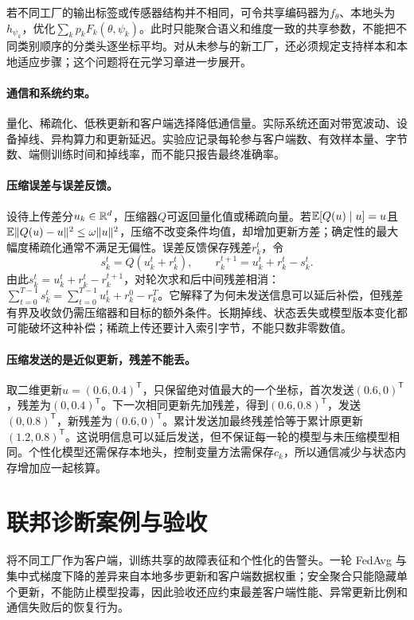 若不同工厂的输出标签或传感器结构并不相同，可令共享编码器为$f_\theta$、本地头为$h_{\psi_k}$，优化$\sum_kp_kF_k(\theta,\psi_k)$。此时只能聚合语义和维度一致的共享参数，不能把不同类别顺序的分类头逐坐标平均。对从未参与的新工厂，还必须规定支持样本和本地适应步骤；这个问题将在元学习章进一步展开。

\paragraph{通信和系统约束。}
量化、稀疏化、低秩更新和客户端选择降低通信量。实际系统还面对带宽波动、设备掉线、异构算力和更新延迟。实验应记录每轮参与客户端数、有效样本量、字节数、端侧训练时间和掉线率，而不能只报告最终准确率。

\paragraph{压缩误差与误差反馈。}
设待上传差分$u_k\in\mathbb{R}^d$，压缩器$Q$可返回量化值或稀疏向量。若$\mathbb{E}[Q(u)\mid u]=u$且$\mathbb{E}\|Q(u)-u\|^2\leq\omega\|u\|^2$，压缩不改变条件均值，却增加更新方差；确定性的最大幅度稀疏化通常不满足无偏性。误差反馈保存残差$r_k^t$，令
\begin{equation}
 s_k^t=Q(u_k^t+r_k^t),\qquad
 r_k^{t+1}=u_k^t+r_k^t-s_k^t.
\end{equation}
由此$s_k^t=u_k^t+r_k^t-r_k^{t+1}$，对轮次求和后中间残差相消：$\sum_{t=0}^{T-1}s_k^t=\sum_{t=0}^{T-1}u_k^t+r_k^0-r_k^T$。它解释了为何未发送信息可以延后补偿，但残差有界及收敛仍需压缩器和目标的额外条件。长期掉线、状态丢失或模型版本变化都可能破坏这种补偿；稀疏上传还要计入索引字节，不能只数非零数值。

\paragraph{压缩发送的是近似更新，残差不能丢。}
取二维更新$u=(0.6,0.4)^{\mathsf T}$，只保留绝对值最大的一个坐标，首次发送$(0.6,0)^{\mathsf T}$，残差为$(0,0.4)^{\mathsf T}$。下一次相同更新先加残差，得到$(0.6,0.8)^{\mathsf T}$，发送$(0,0.8)^{\mathsf T}$，新残差为$(0.6,0)^{\mathsf T}$。累计发送加最终残差恰等于累计原更新$(1.2,0.8)^{\mathsf T}$。这说明信息可以延后发送，但不保证每一轮的模型与未压缩模型相同。个性化模型还需保存本地头，控制变量方法需保存$c_k$，所以通信减少与状态内存增加应一起核算。

\section{联邦诊断案例与验收}
将不同工厂作为客户端，训练共享的故障表征和个性化的告警头。一轮 FedAvg 与集中式梯度下降的差异来自本地多步更新和客户端数据权重；安全聚合只能隐藏单个更新，不能防止模型投毒，因此验收还应约束最差客户端性能、异常更新比例和通信失败后的恢复行为。

